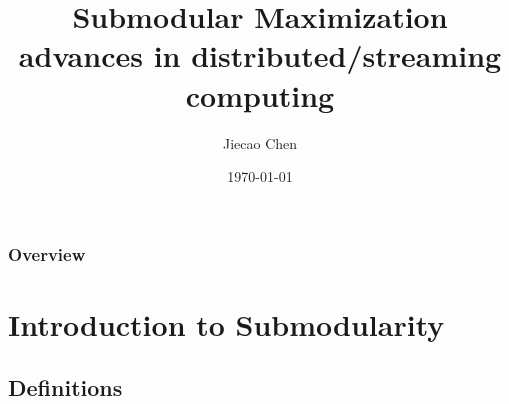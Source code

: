 \documentclass{beamer}
\title[Submodular Maximization]{Submodular Maximization\\\small{advances in distributed/streaming computing}} %
\author{Jiecao Chen} %
\institute[IUB] %
{
Indiana University Bloomington \\ %
\medskip
\textit{jiecchen@indiana} %
}
\date{\today} %
\begin{document}
\begin{frame}
\titlepage %
\end{frame}

\begin{frame}
\frametitle{Overview} %
\tableofcontents %
\end{frame}


\section{Introduction to Submodularity} %

\subsection{Definitions} %
\end{document}
